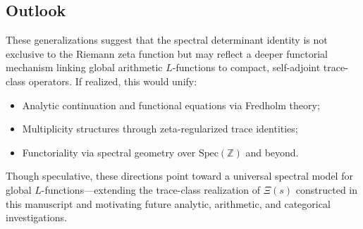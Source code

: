 \subsection*{Outlook}

These generalizations suggest that the spectral determinant identity is not exclusive to the Riemann zeta function but may reflect a deeper functorial mechanism linking global arithmetic \( L \)-functions to compact, self-adjoint trace-class operators. If realized, this would unify:
\begin{itemize}
  \item Analytic continuation and functional equations via Fredholm theory;
  \item Multiplicity structures through zeta-regularized trace identities;
  \item Functoriality via spectral geometry over \( \mathrm{Spec}(\mathbb{Z}) \) and beyond.
\end{itemize}

Though speculative, these directions point toward a universal spectral model for global \( L \)-functions—extending the trace-class realization of \( \Xi(s) \) constructed in this manuscript and motivating future analytic, arithmetic, and categorical investigations.

